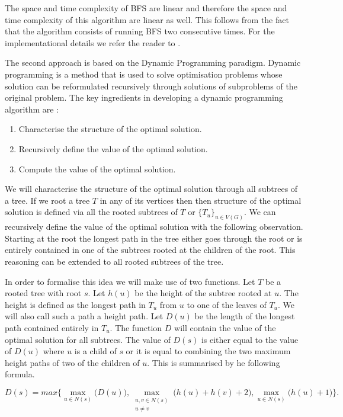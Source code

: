 The space and time complexity of BFS are linear and therefore the space and time complexity of this algorithm are linear as well. This follows from the fact that the algorithm consists of running BFS two consecutive times. For the implementational details we refer the reader to \cite{2bfs-implementation}.

The second approach  \cite{dp-poof} is based on the Dynamic Programming paradigm. Dynamic programming is a method that is used to solve optimisation problems whose solution can be reformulated recursively through solutions of subproblems of the original problem. The key ingredients in developing a dynamic programming algorithm are \cite[p. 359]{intro-to-algo}:

\begin{enumerate}
    \item Characterise the structure of the optimal solution.
    \item Recursively define the value of the optimal solution.
    \item Compute the value of the optimal solution.
\end{enumerate}

We will characterise the structure of the optimal solution through all subtrees of a tree. If we root a tree $T$ in any of its vertices then then structure of the optimal solution is defined via all the rooted subtrees of $T$ or $\{T_u\}_{u \in V(G)}$. We can recursively define the value of the optimal solution with the following observation. Starting at the root the longest path in the tree either goes through the root or is entirely contained in one of the subtrees rooted at the children of the root. This reasoning can be extended to all rooted subtrees of the tree.

In order to formalise this idea we will make use of two functions. Let $T$ be a rooted tree with root $s$. Let $h(u)$ be the height of the subtree rooted at $u$. The height is defined as the longest path in $T_u$ from $u$ to one of the leaves of $T_u$. We will also call such a path a height path. Let $D(u)$ be the length of the longest path contained entirely in $T_u$. The function $D$ will contain the value of the optimal solution for all subtrees. The value of $D(s)$ is either equal to the value of $D(u)$ where $u$ is a child of $s$ or it is equal to combining the two maximum height paths of two of the children of $u$. This is summarised by he following formula.

$$ D(s) = max\bigg\{ \max\limits_{u \in N(s)}\bigg(D(u)\bigg), \max\limits_{\substack{u, v \in N(s) \\ u \ne v}} \bigg(h(u) + h(v) + 2\bigg) , \max\limits_{u \in N(s)}\bigg(h(u) + 1 \bigg)   \bigg\}. $$

